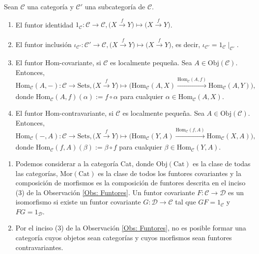 \documentclass[tesis]{subfiles}
\begin{document}
\begin{Ejem}\label{Ejem: Funtores}

    Sean $\mathscr{C}$ una categoría y $\mathscr{C}'$ una subcategoría de $\mathscr{C}$.

    \begin{enumerate}[label=(\arabic*)]
    
        \item El funtor identidad $1_\mathscr{C}:\mathscr{C}\to \mathscr{C}, \big(X\xrightarrow[]{f}Y\big)\mapsto \big(X\xrightarrow[]{f}Y\big)$.

        \item El funtor inclusión $\iota_{\mathscr{C}'}:\mathscr{C}'\to \mathscr{C}, \big(X\xrightarrow[]{f}Y\big)\mapsto \big(X\xrightarrow[]{f}Y\big)$, es decir, $\iota_{\mathscr{C}'} = 1_\mathscr{C}\mid_{\mathscr{C}'}$.

        \item El funtor Hom-covariante, si $\mathscr{C}$ es localmente pequeña. Sea $A\in\text{Obj}(\mathscr{C})$. Entonces,
        \[
            \text{Hom}_\mathscr{C}(A,-):\mathscr{C}\to \text{Sets}, \big(X\xrightarrow[]{f}Y\big) \mapsto \big( \text{Hom}_\mathscr{C}(A,X) \xrightarrow[]{\text{Hom}_\mathscr{C}(A,f)} \text{Hom}_\mathscr{C}(A,Y) \big),
        \]
        donde $\text{Hom}_\mathscr{C}(A,f)(\alpha) := f\circ\alpha$ para cualquier $\alpha\in\text{Hom}_\mathscr{C}(A,X)$.

        \item El funtor Hom-contravariante, si $\mathscr{C}$ es localmente pequeña. Sea $A\in\text{Obj}(\mathscr{C})$. Entonces,
        \[
            \text{Hom}_\mathscr{C}(-,A):\mathscr{C}\to \text{Sets}, \big(X\xrightarrow[]{f}Y\big) \mapsto \big( \text{Hom}_\mathscr{C}(Y,A) \xrightarrow[]{\text{Hom}_\mathscr{C}(f,A)} \text{Hom}_\mathscr{C}(X,A) \big),
        \]
        donde $\text{Hom}_\mathscr{C}(f,A)(\beta) := \beta\circ f$ para cualquier $\beta\in\text{Hom}_\mathscr{C}(Y,A)$.
    \end{enumerate}
\end{Ejem}

\begin{Obs}\label{Obs: La categoría Cat}\leavevmode

    \begin{enumerate}[label=(\arabic*)]
    
        \item Podemos considerar a la categoría Cat, donde $\text{Obj}(\text{Cat})$ es la clase de todas las categorías, $\text{Mor}(\text{Cat})$ es la clase de todos los funtores covariantes y la composición de morfismos es la composición de funtores descrita en el inciso (3) de la Observación \ref{Obs: Funtores}. Un funtor covariante $F:\mathscr{C}\to \mathscr{D}$ es un isomorfismo si existe un funtor covariante $G:\mathscr{D}\to \mathscr{C}$ tal que $GF=1_\mathscr{C}$ y $FG=1_\mathscr{D}$.

        \item Por el inciso (3) de la Observación \ref{Obs: Funtores}, no es posible formar una categoría cuyos objetos sean categorías y cuyos morfismos sean funtores contravariantes.
    \end{enumerate}
\end{Obs}
\end{document}
